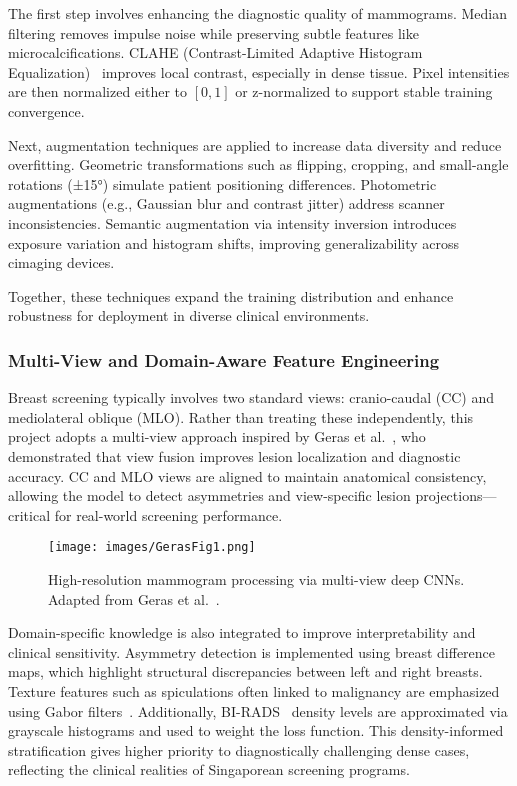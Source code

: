 \documentclass[12pt]{article}
\begin{document}
The first step involves enhancing the diagnostic quality of mammograms. Median filtering removes impulse noise while preserving subtle features like microcalcifications. CLAHE (Contrast-Limited Adaptive Histogram Equalization)~\cite{14} improves local contrast, especially in dense tissue. Pixel intensities are then normalized either to $[0,1]$ or z-normalized to support stable training convergence.

Next, augmentation techniques are applied to increase data diversity and reduce overfitting. Geometric transformations such as flipping, cropping, and small-angle rotations (±15°) simulate patient positioning differences. Photometric augmentations (e.g., Gaussian blur and contrast jitter) address scanner inconsistencies. Semantic augmentation via intensity inversion introduces exposure variation and histogram shifts, improving generalizability across cimaging devices.

Together, these techniques expand the training distribution and enhance robustness for deployment in diverse clinical environments.

\subsubsection{Multi-View and Domain-Aware Feature Engineering}

Breast screening typically involves two standard views: cranio-caudal (CC) and mediolateral oblique (MLO). Rather than treating these independently, this project adopts a multi-view approach inspired by Geras et al.~\cite{8}, who demonstrated that view fusion improves lesion localization and diagnostic accuracy. CC and MLO views are aligned to maintain anatomical consistency, allowing the model to detect asymmetries and view-specific lesion projections—critical for real-world screening performance.

\begin{figure}[H]
\centering
\texttt{[image: images/GerasFig1.png]}
\caption{High-resolution mammogram processing via multi-view deep CNNs. Adapted from Geras et al.~\cite{8}.}
\label{fig:geras}
\end{figure}

Domain-specific knowledge is also integrated to improve interpretability and clinical sensitivity. Asymmetry detection is implemented using breast difference maps, which highlight structural discrepancies between left and right breasts. Texture features such as spiculations often linked to malignancy are emphasized using Gabor filters~\cite{20}. Additionally, BI-RADS~\cite{16} density levels are approximated via grayscale histograms and used to weight the loss function. This density-informed stratification gives higher priority to diagnostically challenging dense cases, reflecting the clinical realities of Singaporean screening programs.
\end{document}
